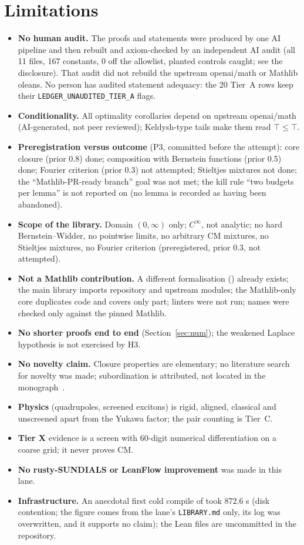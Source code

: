 \documentclass[10pt]{article}
\theoremstyle{remark}
\newcommand{\lean}[1]{\texttt{\detokenize{#1}}}
\newcommand{\CM}{\mathrm{CM}}
\begin{document}
\section{Limitations}\label{sec:lim}
\begin{itemize}\itemsep0pt
\item \textbf{No human audit.} The proofs and statements were produced by one AI pipeline and then rebuilt and axiom-checked by an independent AI audit (all 11 files, 167 constants, 0 off the allowlist, planted controls caught; see the disclosure). That audit did not rebuild the upstream openai/math or Mathlib oleans. No person has audited statement adequacy: the 20 Tier~A rows keep their \texttt{LEDGER\_UNAUDITED\_TIER\_A} flags.
\item \textbf{Conditionality.} All optimality corollaries depend on upstream openai/math (AI-generated, not peer reviewed); Keldysh-type tails make them read $\top\le\top$.
\item \textbf{Preregistration versus outcome} (P3, committed before the attempt): core closure (prior 0.8) done; composition with Bernstein functions (prior 0.5) done; Fourier criterion (prior 0.3) not attempted; Stieltjes mixtures not done; the ``Mathlib-PR-ready branch'' goal was not met; the kill rule ``two budgets per lemma'' is not reported on (no lemma is recorded as having been abandoned).
\item \textbf{Scope of the library.} Domain $(0,\infty)$ only; $C^\infty$, not analytic; no hard Bernstein--Widder, no pointwise limits, no arbitrary CM mixtures, no Stieltjes mixtures, no Fourier criterion (preregistered, prior 0.3, not attempted).
\item \textbf{Not a Mathlib contribution.} A different formalisation (\lean{AbsolutelyMonotoneOn}) already exists; the main library imports repository and upstream modules; the Mathlib-only core duplicates code and covers only part; linters were not run; names were checked only against the pinned Mathlib.
\item \textbf{No shorter proofs end to end} (Section~\ref{sec:num}); the weakened Laplace hypothesis is not exercised by H3.
\item \textbf{No novelty claim.} Closure properties are elementary; no literature search for novelty was made; subordination is attributed, not located in the monograph~\cite{ssv}.
\item \textbf{Physics} (quadrupoles, screened excitons) is rigid, aligned, classical and unscreened apart from the Yukawa factor; the pair counting is Tier~C.
\item \textbf{Tier X} evidence is a screen with 60-digit numerical differentiation on a coarse grid; it never proves $\CM$.
\item \textbf{No rusty-SUNDIALS or LeanFlow improvement} was made in this lane.
\item \textbf{Infrastructure.} An anecdotal first cold compile of \lean{Basic} took 872.6 s (disk contention; the figure comes from the lane's \texttt{LIBRARY.md} only, its log was overwritten, and it supports no claim); the Lean files are uncommitted in the repository.
\end{itemize}
\end{document}

